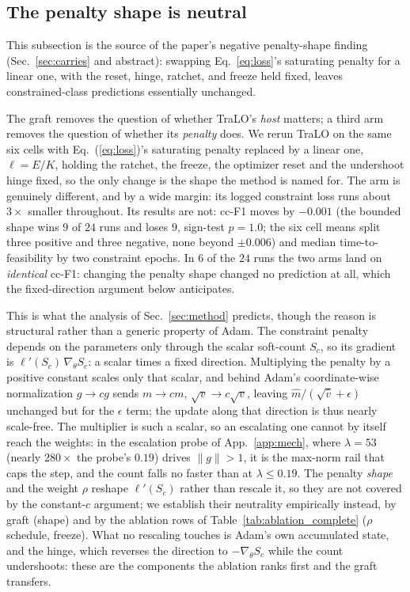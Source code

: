 \documentclass[10pt]{article}
\begin{document}
\subsection{The penalty shape is neutral}
\label{app:shape}

This subsection is the source of the paper's negative penalty-shape
finding (Sec.~\ref{sec:carries} and abstract): swapping
Eq.~\eqref{eq:loss}'s saturating penalty for a linear one, with the
reset, hinge, ratchet, and freeze held fixed, leaves constrained-class
predictions essentially unchanged.

The graft removes the question of whether TraLO's \emph{host} matters; a
third arm removes the question of whether its \emph{penalty} does. We
rerun TraLO on the same six cells with Eq.~(\ref{eq:loss})'s saturating
penalty replaced by a linear one, $\ell = E/K$, holding the ratchet, the
freeze, the optimizer reset and the undershoot hinge fixed, so the only
change is the shape the method is named for. The arm is genuinely
different, and by a wide margin: its logged constraint loss runs about
$3\times$ smaller throughout. Its results are not: cc-F1 moves by
$-0.001$ (the bounded shape wins $9$ of $24$ runs and loses $9$,
sign-test $p{=}1.0$; the six cell means split three positive and three
negative, none beyond $\pm0.006$) and median time-to-feasibility by two
constraint epochs. In $6$ of the $24$ runs the two arms land on
\emph{identical} cc-F1: changing the penalty shape changed no
prediction at all, which the fixed-direction argument below anticipates.

This is what the analysis of Sec.~\ref{sec:method} predicts, though the
reason is structural rather than a generic property of Adam. The
constraint penalty depends on the parameters only through the scalar
soft-count $S_c$, so its gradient is $\ell'(S_c)\,\nabla_\theta S_c$: a
scalar times a fixed direction. Multiplying the penalty by a positive
constant scales only that scalar, and behind Adam's coordinate-wise
normalization $g\!\to\!cg$ sends $m\!\to\!cm$, $\sqrt{v}\!\to\!c\sqrt{v}$,
leaving $\hat m/(\sqrt{\hat v}+\epsilon)$ unchanged but for the
$\epsilon$ term; the update along that direction is thus nearly
scale-free. The multiplier is such a scalar, so an escalating one
cannot by itself reach the weights: in the escalation probe of
App.~\ref{app:mech}, where $\lambda{=}53$ (nearly $280\times$ the
probe's $0.19$) drives $\|g\|{>}1$, it is the max-norm rail that caps
the step, and the count falls no faster than at $\lambda\!\le\!0.19$.
The penalty \emph{shape} and the weight $\rho$ reshape $\ell'(S_c)$
rather than rescale it, so they are not covered by the constant-$c$
argument; we establish their neutrality empirically instead, by graft
(shape) and by the ablation rows of Table~\ref{tab:ablation_complete}
($\rho$ schedule, freeze). What no rescaling touches is Adam's own
accumulated state, and the hinge, which reverses the direction to
$-\nabla_\theta S_c$ while the count undershoots: these are the
components the ablation ranks first and the graft transfers.
\end{document}
